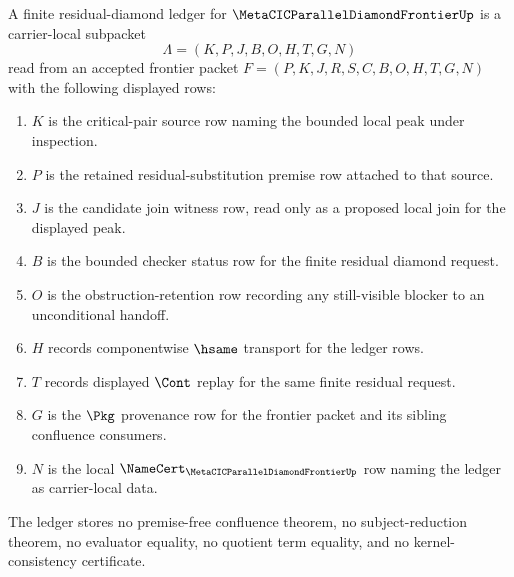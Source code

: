 \begin{definition}
\label{def:metacic-finite-residual-diamond-ledger-carrier}
A finite residual-diamond ledger for $\MetaCICParallelDiamondFrontierUp$ is a carrier-local subpacket
$$
\Lambda=(K,P,J,B,O,H,T,G,N)
$$
read from an accepted frontier packet $F=(P,K,J,R,S,C,B,O,H,T,G,N)$ with the following displayed rows:
\begin{enumerate}
\item $K$ is the critical-pair source row naming the bounded local peak under inspection.
\item $P$ is the retained residual-substitution premise row attached to that source.
\item $J$ is the candidate join witness row, read only as a proposed local join for the displayed peak.
\item $B$ is the bounded checker status row for the finite residual diamond request.
\item $O$ is the obstruction-retention row recording any still-visible blocker to an unconditional handoff.
\item $H$ records componentwise $\hsame$ transport for the ledger rows.
\item $T$ records displayed $\Cont$ replay for the same finite residual request.
\item $G$ is the $\Pkg$ provenance row for the frontier packet and its sibling confluence consumers.
\item $N$ is the local $\NameCert_{\MetaCICParallelDiamondFrontierUp}$ row naming the ledger as carrier-local data.
\end{enumerate}
The ledger stores no premise-free confluence theorem, no subject-reduction theorem, no evaluator equality, no quotient term equality, and no kernel-consistency certificate.
\end{definition}

